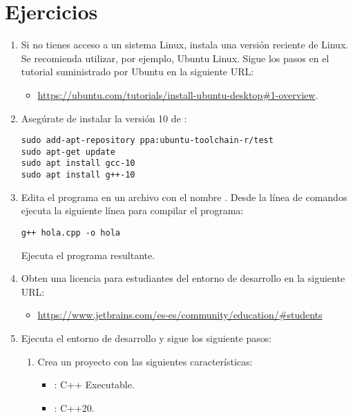 \section{Ejercicios}

\begin{enumerate}

\item Si no tienes acceso a un sistema Linux, instala una versión reciente de Linux.
Se recomienda utilizar, por ejemplo, Ubuntu Linux. Sigue los pasos en el tutorial
suministrado por Ubuntu en la siguiente URL:

  \begin{itemize}
    \item \url{https://ubuntu.com/tutorials/install-ubuntu-desktop#1-overview}.
  \end{itemize}

\item Asegúrate de instalar la versión 10 de :

\begin{lstlisting}[style=terminal]
sudo add-apt-repository ppa:ubuntu-toolchain-r/test
sudo apt-get update
sudo apt install gcc-10
sudo apt install g++-10
\end{lstlisting}

\item Edita el programa en un archivo con el nombre . Desde la 
línea de comandos ejecuta la siguiente línea para compilar el programa:

\begin{lstlisting}[style=terminal]
g++ hola.cpp -o hola
\end{lstlisting}

Ejecuta el programa resultante.

\item Obten una licencia para estudiantes del entorno de desarrollo 
en la siguiente URL:
\begin{itemize}
  \item \url{https://www.jetbrains.com/es-es/community/education/#students}
\end{itemize}

\item Ejecuta el entorno de desarrollo  y sigue los siguiente pasos:

\begin{enumerate}
\item Crea un proyecto con las siguientes características:
\begin{itemize}
  \item {}: C++ Executable.
  \item {}: C++20.
\end{itemize}


\end{enumerate}
\end{enumerate}
